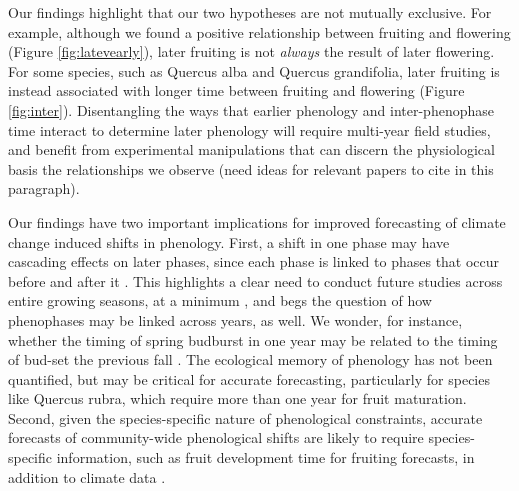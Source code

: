 \documentclass{article}
\begin{document}
\par Our findings highlight that our two hypotheses are not mutually exclusive. For example, although we found a positive relationship between fruiting and flowering (Figure \ref{fig:latevearly}), later fruiting is not \textit{always} the result of later flowering. For some species, such as Quercus alba and Quercus grandifolia, later fruiting is instead associated with longer time between fruiting and flowering (Figure \ref{fig:inter}). Disentangling the ways that earlier phenology and inter-phenophase time interact to determine later phenology will require multi-year field studies, and benefit from experimental manipulations that can discern the physiological basis the relationships we observe (need ideas for relevant papers to cite in this paragraph).

\par Our findings have two important implications for improved forecasting of climate change induced shifts in phenology. First, a shift in one phase may have cascading effects on later phases, since each phase is linked to phases that occur before and after it \citep{wolkovich2014b}. This highlights a clear need to conduct future studies across entire growing seasons, at a minimum \citep{wolkovich2014}, and begs the question of how phenophases may be linked across years, as well. We wonder, for instance, whether the timing of spring budburst in one year may be related to the timing of bud-set the previous fall \citep {mimura2010}. The ecological memory \citep {ogle2015} of phenology has not been quantified, but may be critical for accurate forecasting, particularly for species like Quercus rubra, which require more than one year for fruit maturation. Second, given the species-specific nature of phenological constraints, accurate forecasts of community-wide phenological shifts are likely to require species-specific information, such as fruit development time for fruiting forecasts, in addition to climate data \citep{diez2012}. %
\end{document}

